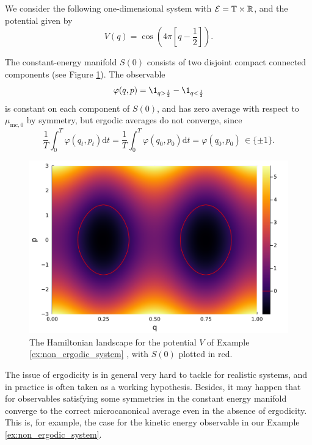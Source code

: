     \begin{example}\label{ex:non_ergodic_system}
        We consider the following one-dimensional system with $\mathcal E= \mathbb T \times \mathbb{R}$, and the potential given by 
        \[V(q)=\cos\left(4\pi\left[q-\frac12\right]\right).\]
        
        The constant-energy manifold $S(0)$ consists of two disjoint compact connected components (see Figure \ref{fig:non_ergodic_system}). The observable
        \[\varphi(q,p)=\1_{q>\frac12}-\1_{q<\frac12}\]
        is constant on each component of $S(0)$, and has zero average with respect to $\mu_{\mathrm{mc,0}}$ by symmetry, but ergodic averages do not converge, since 
        \[\frac{1}{T} \int_0^T \varphi(q_t,p_t)\mathrm{d}t =  \frac{1}{T}\int_0^T \varphi(q_0,p_0)\mathrm{d}t=\varphi(q_0,p_0)\,\in\{\pm 1\}.\]
        \begin{figure}[htbp]
            \begin{center}
              \includegraphics[width=0.7\linewidth]{figures/chapter1/ergodicity.pdf}
              \caption{ \label{fig:non_ergodic_system}
                The Hamiltonian landscape for the potential $V$ of Example \ref{ex:non_ergodic_system} , with $S(0)$ plotted in red.
              }
            \end{center}
          \end{figure}
    \end{example}

    The issue of ergodicity is in general very hard to tackle for realistic systems, and in practice is often taken as a working hypothesis.
     Besides, it may happen that for observables satisfying some symmetries in the constant energy manifold converge to the correct microcanonical average even in the absence of ergodicity.
     This is, for example, the case for the kinetic energy observable in our Example \ref{ex:non_ergodic_system}.

